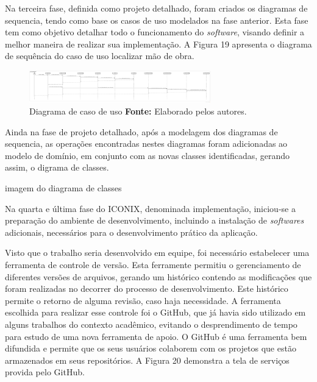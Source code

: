 \par Na terceira fase, definida como projeto detalhado, foram criados os diagramas de sequencia, tendo como base os casos de uso modelados na fase anterior. Esta fase tem como objetivo detalhar todo o funcionamento do \textit{software}, visando definir a melhor maneira de realizar sua implementação. A Figura 19 apresenta o diagrama de sequência do caso de uso localizar mão de obra.

\newpage
\begin{figure}[h!]
	\centerline{\includegraphics[angle=90,height=0.7\textheight,width=0.7\textwidth]{./imagens/sequence-localizar-mao-de-obra.png}}
	\caption[Diagrama de caso de uso]
	{Diagrama de caso de uso \textbf{Fonte:} Elaborado pelos autores.}
	\label{fig:exemplo1}
\end{figure}

\par Ainda na fase de projeto detalhado, após a modelagem dos diagramas de sequencia, as operações encontradas nestes diagramas foram adicionadas ao modelo de domínio, em conjunto com as novas classes identificadas, gerando assim, o digrama de classes.

imagem do diagrama de classes


\par Na quarta e última fase do ICONIX, denominada implementação, iniciou-se a preparação do ambiente de desenvolvimento, incluindo a instalação de \textit{softwares} adicionais, necessários para o desenvolvimento prático da aplicação.

\par Visto que o trabalho seria desenvolvido em equipe, foi necessário estabelecer uma ferramenta de controle de versão. Esta ferramente permitiu o gerenciamento de diferentes versões de arquivos, gerando um histórico contendo as modificações que foram realizadas no decorrer do processo de desenvolvimento. Este histórico permite o retorno de alguma revisão, caso haja necessidade. A ferramenta escolhida para realizar esse controle foi o GitHub, que já havia sido utilizado em alguns trabalhos do contexto acadêmico, evitando o desprendimento de tempo para estudo de uma nova ferramenta de apoio. O GitHub é uma ferramenta bem difundida e permite que os seus usuários colaborem com os projetos que estão armazenados em seus repositórios\footnotemark[31]. A Figura 20 demonstra a tela de serviços provida pelo GitHub.

